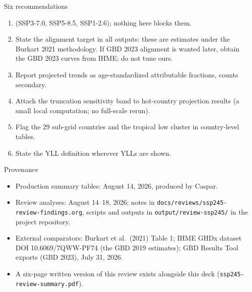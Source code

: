\documentclass[aspectratio=169,11pt]{beamer}
\begin{document}
\begin{frame}{Six recommendations}
  \begin{enumerate}
    \item {}
      (SSP3-7.0, SSP5-8.5, SSP1-2.6); nothing here blocks them.
    \item State the alignment target in all outputs: these are estimates
      under the Burkart 2021 methodology. If GBD 2023 alignment is
      wanted later, obtain the GBD 2023 curves from IHME; do not tune
      ours.
    \item Report projected trends as age-standardized attributable
      fractions, counts secondary.
    \item Attach the truncation sensitivity band to hot-country projection
      results (a small local computation; no full-scale rerun).
    \item Flag the 29 sub-grid countries and the tropical low cluster in
      country-level tables.
    \item State the YLL definition wherever YLLs are shown.
  \end{enumerate}
\end{frame}

\begin{frame}{Provenance}
  \begin{itemize}
    \item Production summary tables: August 14, 2026, produced by Caspar.
    \item Review analyses: August 14--18, 2026; notes in
      \texttt{docs/reviews/ssp245-review-findings.org}, scripts and outputs in
      \texttt{output/review-ssp245/} in the project repository.
    \item External comparators: Burkart et al.\ (2021) Table 1; IHME GHDx
      dataset DOI 10.6069/7QWW-PF74 (the GBD 2019 estimates); GBD
      Results Tool exports (GBD 2023), July 31, 2026.
    \item A six-page written version of this review exists alongside this
      deck (\texttt{ssp245-review-summary.pdf}).
  \end{itemize}
\end{frame}
\end{document}
